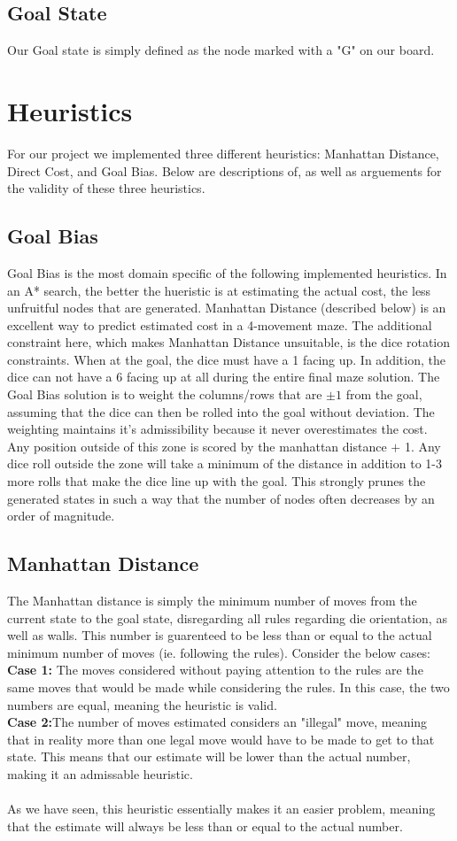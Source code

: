 \documentclass{article}
\begin{document}
\subsection*{Goal State}
Our Goal state is simply defined as the node marked with a "G" on our board.  
\section*{Heuristics}
For our project we implemented three different heuristics: Manhattan Distance, Direct Cost, and Goal Bias.  Below are descriptions of, as well as arguements for the validity of these three heuristics.
\subsection*{Goal Bias}
Goal Bias is the most domain specific of the following implemented heuristics. In an A* search, the better the hueristic is at estimating the actual cost, the less unfruitful nodes that are generated. Manhattan Distance (described below) is an excellent way to predict estimated cost in a 4-movement maze. The additional constraint here, which makes Manhattan Distance unsuitable, is the dice rotation constraints. When at the goal, the dice must have a 1 facing up. In addition, the dice can not have a 6 facing up at all during the entire final maze solution. The Goal Bias solution is to weight the columns/rows that are $\pm 1$ from the goal, assuming that the dice can then be rolled into the goal without deviation. The weighting maintains it's admissibility because it never overestimates the cost. Any position outside of this zone is scored by the manhattan distance $+$ 1. Any dice roll outside the zone will take a minimum of the distance in addition to 1-3 more rolls that make the dice line up with the goal. This strongly prunes the generated states in such a way that the number of nodes often decreases by an order of magnitude. 

\subsection*{Manhattan Distance}
The Manhattan distance is simply the minimum number of moves from the current state to the goal state, disregarding all rules regarding die orientation, as well as walls.  This number is guarenteed to be less than or equal to the actual minimum number of moves (ie. following the rules).  Consider the below cases:\\
\textbf{Case 1:} The moves considered without paying attention to the rules are the same moves that would be made while considering the rules.  In this case, the two numbers are equal, meaning the heuristic is valid.\\
\textbf{Case 2:}The number of moves estimated considers an "illegal" move, meaning that in reality more than one legal move would have to be made to get to that state.  This means that our estimate will be lower than the actual number, making it an admissable heuristic.\\\\
As we have seen, this heuristic essentially makes it an easier problem, meaning that the estimate will always be less than or equal to the actual number.  
\end{document}

